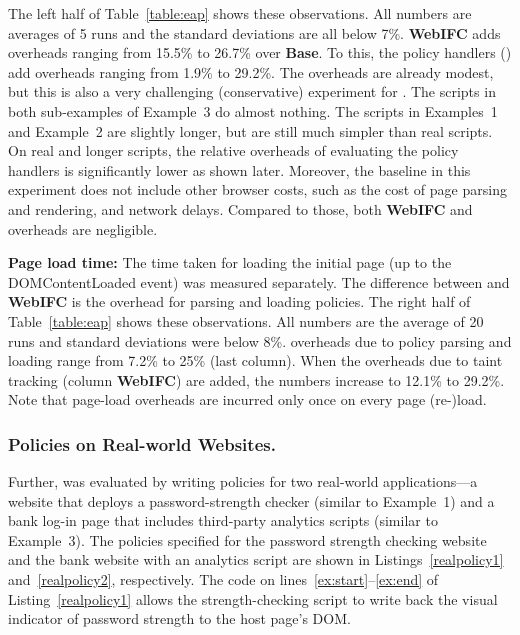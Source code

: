 The left half of Table~\ref{table:eap} shows these observations.
%
All numbers are averages of 5 runs and the standard deviations are
all below 7\%. %
%
\textbf{WebIFC} adds overheads ranging from 15.5\% to
26.7\% over \textbf{Base}. To this, the policy handlers (\textbf{\sys})
add overheads ranging from 1.9\% to 29.2\%. The \textbf{\sys}
overheads are already modest, but this is also a very challenging
(conservative) experiment for {\sys}. The scripts in 
both sub-examples of Example~3 do almost nothing. The scripts in
Examples~1 and Example~2 are slightly longer, but are still much
simpler than real scripts. On real and longer scripts, the relative
overheads of evaluating the policy handlers is significantly lower as
shown later. Moreover, the baseline in this experiment does not
include other browser costs, such as the cost of page parsing and
rendering, and network delays. Compared to those, both \textbf{WebIFC}
and \textbf{\sys} overheads are negligible.

\noindent
\textbf{Page load time:} The time taken for loading the initial page
(up to the DOMContentLoaded event) was measured separately. The
difference between \textbf{\sys} and \textbf{WebIFC} is the overhead for
parsing and loading policies. The right half of Table~\ref{table:eap}
shows these observations. All numbers are the average of 20 runs and
standard deviations were below 8\%.
{\sys} overheads due to policy parsing and loading range from 7.2\% to
25\% (last column). When the overheads due to taint tracking
(column \textbf{WebIFC}) are added, the numbers increase to 12.1\% to
29.2\%. Note that page-load overheads are incurred only once on every
page (re-)load. 

\subsubsection{Policies on Real-world Websites.}
\label{sec:realpolicies}

Further, {\sys} was evaluated by writing policies for two real-world
applications---a website that deploys a password-strength checker
(similar to Example~1) and a bank log-in page that includes third-party
analytics scripts (similar to Example~3).
The {\sys} policies specified for the password strength checking
website and the bank website with an analytics script are shown in
Listings~\ref{realpolicy1} and~\ref{realpolicy2}, respectively. The
code on lines~\ref{ex:start}--\ref{ex:end} of
Listing~\ref{realpolicy1} allows the strength-checking script to write
back the visual indicator of password strength to the host page's DOM.

